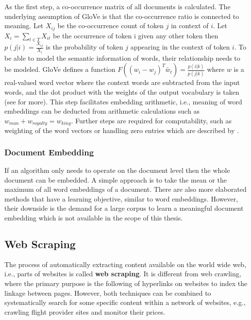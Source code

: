 As the first step, a co-occurrence matrix of all documents is calculated. The underlying assumption of GloVe is that the co-occurrence ratio is connected to meaning.
Let $X_{ij}$ be the co-occurrence count of token $j$ in context of $i$. Let $X_i = \sum_{t \in T} X_{it}$ be the occurrence of token i given any other token then $p(j|i) = \frac{X_{ij}}{X_i}$ is the probability of token $j$ appearing in the context of token $i$.
To be able to model the semantic information of words, their relationship needs to be modeled. GloVe defines a function $F((w_i-w_j)^T \widetilde{w_t}) = \frac{p(i|k)}{p(j|k)}$ where $w$ is a real-valued word vector where the context words are subtracted from the input words, and the dot product with the weights of the output vocabulary is taken (see \cite{Pennington2014} for more). This step facilitates embedding arithmetic, i.e., meaning of word embeddings can be deducted from arithmetic calculations such as $w_{man} + w_{royalty} = w_{king}$. Further steps are required for computability, such as weighting of the word vectors or handling zero entries which are described by \cite{Pennington2014}.


\subsubsection{Document Embedding}
If an algorithm only needs to operate on the document level then the whole document can be embedded. A simple approach is to take the mean or the maximum of all word embeddings of a document. There are also more elaborated methods \citep{Wu2018, Liu2018, Andrew2015} that have a learning objective, similar to word embeddings. However, their downside is the demand for a large corpus to learn a meaningful document embedding which is not available in the scope of this thesis.

\subsection{Web Scraping}
The process of automatically extracting content available on the world wide web, i.e., parts of websites is called \textbf{web scraping}. It is different from web crawling, where the primary purpose is the following of hyperlinks on websites to index the linkage between pages. However, both techniques can be combined to systematically search for some specific content within a network of websites, e.g., crawling flight provider sites and monitor their prices.


